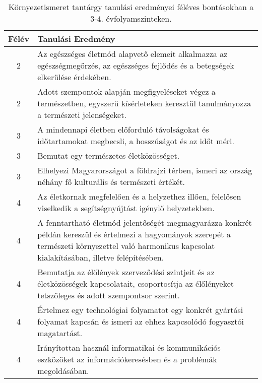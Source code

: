        
           \begin{longtable}{c | p{12cm} }
            \caption[Környezetismeret 3-4.]{Környezetismeret tantárgy tanulási eredményei féléves bontásokban a 3-4. évfolyamszinteken. }  \\

            \textbf{Félév} & \textbf{Tanulási Eredmény} \\
            \hline
            \endhead
                                
                                          2 &  Az egészséges életmód alapvető elemeit alkalmazza az egészségmegőrzés, az egészséges fejlődés és a betegségek elkerülése érdekében. \\ \hline
                                          2 &  Adott szempontok alapján megfigyeléseket végez a természetben, egyszerű kísérleteken keresztül tanulmányozza a természeti jelenségeket. \\ \hline
                                      
                                
                                          3 &  A mindennapi életben előforduló távolságokat és időtartamokat megbecsli, a hosszúságot és az időt méri. \\ \hline
                                          3 &  Bemutat egy természetes életközösséget. \\ \hline
                                          3 &  Elhelyezi Magyarországot a földrajzi térben, ismeri az ország néhány fő kulturális és természeti értékét. \\ \hline
                                      
                                
                                          4 &  Az életkornak megfelelően és a helyzethez illően, felelősen viselkedik a segítségnyújtást igénylő helyzetekben. \\ \hline
                                          4 &  A fenntartható életmód jelentőségét megmagyarázza konkrét példán kereszül és értelmezi a hagyományok szerepét a természeti környezettel való harmonikus kapcsolat kialakításában, illetve felépítésében. \\ \hline
                                          4 &  Bemutatja az élőlények szerveződési szintjeit és az életközösségek kapcsolatait, csoportosítja az élőlényeket tetszőleges és adott szempontsor szerint. \\ \hline
                                          4 &  Értelmez egy technológiai folyamatot egy konkrét gyártási folyamat kapcsán és ismeri az ehhez kapcsolódó fogyasztói magatartást. \\ \hline
                                          4 &  Irányítottan használ informatikai és kommunikációs eszközöket az információkeresésben és a problémák megoldásában. \\ \hline
                                      
                        \end{longtable}
            \clearpage

